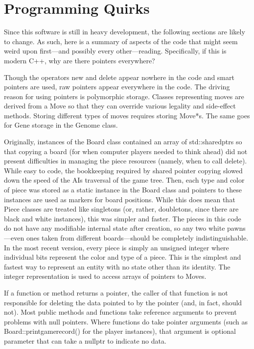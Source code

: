 \documentclass[letterpaper]{article}
\newcommand{\cpp}{C{\nobreak+}{\nobreak+}}
\newcommand{\code}[1]{\small\textsf{#1}}
\renewcommand{\_}{\allowbreak\textunderscore\allowbreak}
\begin{document}
\section{Programming Quirks}

Since this software is still in heavy development, the following sections are likely to change. As such, here is a summary of aspects of the code that might seem weird upon first---and possibly every other---reading. Specifically, if this is modern \cpp{}, why are there pointers everywhere?

Though the operators \code{new} and \code{delete} appear nowhere in the code and smart pointers are used, raw pointers appear everywhere in the code. The driving reason for using pointers is polymorphic storage. Classes representing moves are derived from a \code{Move} so that they can override various legality and side-effect methods. Storing different types of moves requires storing \code{Move*}s. The same goes for \code{Gene} storage in the \code{Genome} class.

Originally, instances of the \code{Board} class contained an array of \code{std::shared\_ptr}s so that copying a board (for when computer players needed to think ahead) did not present difficulties in managing the piece resources (namely, when to call \code{delete}). While easy to code, the bookkeeping required by shared pointer copying slowed down the speed of the AIs traversal of the game tree. Then, each type and color of piece was stored as a static instance in the \code{Board} class and pointers to these instances are used as markers for board positions. While this does mean that \code{Piece} classes are treated like singletons (or, rather, doubletons, since there are black and white instances), this was simpler and faster. The pieces in this code do not have any modifiable internal state after creation, so any two white pawns---even ones taken from different boards---should be completely indistinguishable. In the most recent version, every piece is simply an unsigned integer where individual bits represent the color and type of a piece. This is the simplest and fastest way to represent an entity with no state other than its identity. The integer representation is used to access arrays of pointers to \code{Move}s.

If a function or method returns a pointer, the caller of that function is not responsible for deleting the data pointed to by the pointer (and, in fact, should not). Most public methods and functions take reference arguments to prevent problems with null pointers. Where functions do take pointer arguments (such as \code{Board::print\_game\_record()} for the player instances), that argument is optional parameter that can take a \code{nullptr} to indicate no data.
\end{document}
